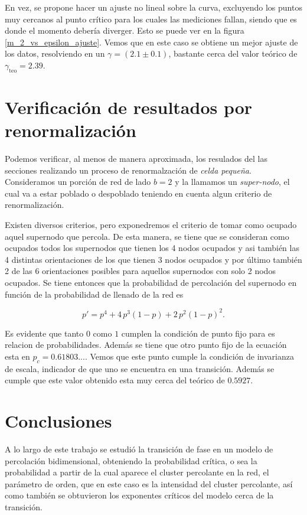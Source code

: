 \documentclass[
 reprint,
 amsmath,amssymb,
 aps,
]{revtex4-1}
\begin{document}
En vez, se propone hacer un ajuste no lineal sobre la curva, excluyendo los puntos muy cercanos al punto cr\'itico para los cuales las mediciones fallan, siendo que es donde el momento deber\'ia diverger. Esto se puede ver en la figura \ref{m_2_vs_epsilon_ajuste}. Vemos que en este caso se obtiene un mejor ajuste de los datos, resolviendo en un $\gamma = (2.1 \pm 0.1)$, bastante cerca del valor te\'orico de $\gamma_\text{teo} = 2.39$.


\section{\label{R} Verificaci\'on de resultados por renormalizaci\'on}

Podemos verificar, al menos de manera aproximada, los resulados del las secciones realizando un proceso de renormalzaci\'on de \emph{celda peque\~na}. Consideramos un porci\'on de red de lado $b=2$ y la llamamos un \emph{super-nodo}, el cual va a estar poblado o despoblado teniendo en cuenta algun criterio de renormalizaci\'on.

Existen diversos criterios, pero exponedremos el criterio de tomar como ocupado aquel supernodo que percola. De esta manera, se tiene que se consideran como ocupados todos los supernodos que tienen los 4 nodos ocupados y asi tambi\'en las 4 distintas orientaciones de los que tienen 3 nodos ocupados y por \'ultimo tambi\'en 2 de las 6 orientaciones posibles para aquellos supernodos con solo 2 nodos ocupados. Se tiene entonces que la probabilidad de percolaci\'on del supernodo en funci\'on de la probabilidad de llenado de la red es

\begin{equation}
  p' = p^4 + 4\, p^3(1 - p) + 2\, p^2(1 - p)^2.
\end{equation}

Es evidente que tanto $0$ como $1$ cumplen la condici\'on de punto fijo para es relacion de probabilidades. Adem\'as se tiene que otro punto fijo de la ecuaci\'on esta en $p_c = 0.61803...$. Vemos que este punto cumple la condici\'on de invarianza de escala, indicador de que uno se encuentra en una transici\'on. Adem\'as se cumple que este valor obtenido esta muy cerca del te\'orico de $0.5927$.

\section{\label{conclusions}Conclusiones}

A lo largo de este trabajo se estudi\'o la transici\'on de fase en un modelo de percolaci\'on bidimensional, obteniendo la probabilidad cr\'itica, o sea la probabilidad a partir de la cual aparece el cluster percolante en la red, el par\'ametro de orden, que en este caso es la intensidad del cluster percolante, as\'i como tambi\'en se obtuvieron los exponentes cr\'iticos del modelo cerca de la transici\'on.
\end{document}
